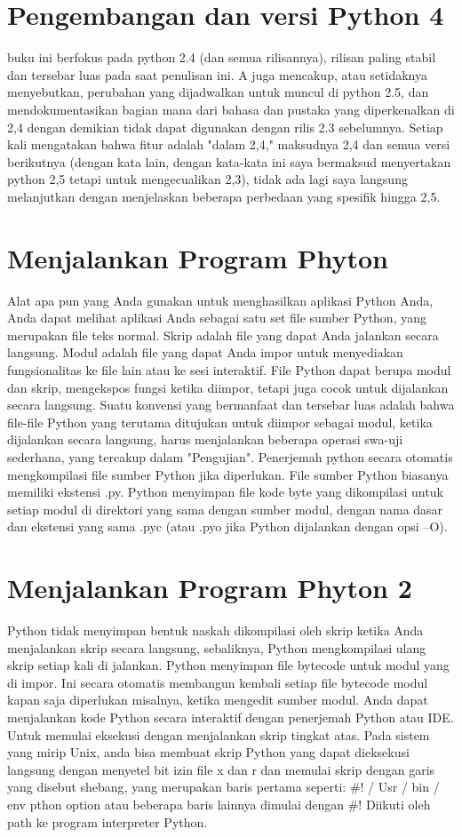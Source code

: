 \documentclass[12pt, times new roman, a4paper]{article}
\begin{document}
\section{Pengembangan dan versi Python 4}
buku ini berfokus pada python 2.4 (dan semua rilisannya), rilisan paling stabil dan tersebar luas pada saat penulisan ini. A juga mencakup, atau setidaknya menyebutkan, perubahan yang dijadwalkan untuk muncul di python 2.5, dan mendokumentasikan bagian mana dari bahasa dan pustaka yang diperkenalkan di 2,4 dengan demikian tidak dapat digunakan dengan rilis 2.3 sebelumnya. Setiap kali mengatakan bahwa fitur adalah "dalam 2,4," maksudnya 2,4 dan semua versi berikutnya (dengan kata lain, dengan kata-kata ini saya bermaksud menyertakan python 2,5 tetapi untuk mengecualikan 2,3), tidak ada lagi saya langsung melanjutkan dengan menjelaskan beberapa perbedaan yang spesifik hingga 2,5.

\section{Menjalankan Program Phyton}
Alat apa pun yang Anda gunakan untuk menghasilkan aplikasi Python Anda, Anda dapat melihat aplikasi Anda sebagai satu set file sumber Python, yang merupakan file teks normal. Skrip adalah file yang dapat Anda jalankan secara langsung. Modul adalah file yang dapat Anda impor untuk menyediakan fungsionalitas ke file lain atau ke sesi interaktif. File Python dapat berupa modul dan skrip, mengekspos fungsi ketika diimpor, tetapi juga cocok untuk dijalankan secara langsung. Suatu konvensi yang bermanfaat dan tersebar luas adalah bahwa file-file Python yang terutama ditujukan untuk diimpor sebagai modul, ketika dijalankan secara langsung, harus menjalankan beberapa operasi swa-uji sederhana, yang tercakup dalam "Pengujian". Penerjemah python secara otomatis mengkompilasi file sumber Python jika diperlukan. File sumber Python biasanya memiliki ekstensi .py. Python menyimpan file kode byte yang dikompilasi untuk setiap modul di direktori yang sama dengan sumber modul, dengan nama dasar dan ekstensi yang sama .pyc (atau .pyo jika Python dijalankan dengan opsi –O).

\section{Menjalankan Program Phyton 2}
Python tidak menyimpan bentuk naskah dikompilasi oleh skrip ketika Anda menjalankan skrip secara langsung, sebaliknya, Python mengkompilasi ulang skrip setiap kali di jalankan. Python menyimpan file bytecode untuk modul yang di impor. Ini secara otomatis membangun kembali setiap file bytecode modul kapan saja diperlukan misalnya, ketika mengedit sumber modul. Anda dapat menjalankan kode Python secara interaktif dengan penerjemah Python atau IDE. Untuk memulai eksekusi dengan menjalankan skrip tingkat atas. Pada sistem yang mirip Unix, anda bisa membuat skrip Python yang dapat dieksekusi langsung dengan menyetel bit izin file x dan r dan memulai skrip dengan garis yang disebut shebang, yang merupakan baris pertama seperti: #! / Usr / bin / env pthon {option} atau beberapa baris lainnya dimulai dengan #! Diikuti oleh path ke program interpreter Python.
\end{document}
